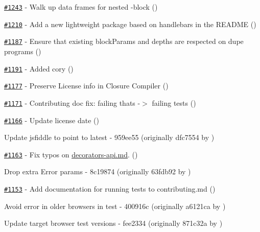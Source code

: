 \begin{DoxyItemize}
\item \href{https://github.com/wycats/handlebars.js/pull/1243}{\tt \#1243} -\/ Walk up data frames for nested -\/block (\href{https://github.com/lawnsea}{\tt })
\item \href{https://github.com/wycats/handlebars.js/pull/1210}{\tt \#1210} -\/ Add a new lightweight package based on handlebars in the R\+E\+A\+D\+ME (\href{https://github.com/kabirbaidhya}{\tt })
\item \href{https://github.com/wycats/handlebars.js/pull/1187}{\tt \#1187} -\/ Ensure that existing block\+Params and depths are respected on dupe programs (\href{https://github.com/charleso}{\tt })
\item \href{https://github.com/wycats/handlebars.js/pull/1191}{\tt \#1191} -\/ Added cory (\href{https://github.com/leo}{\tt })
\item \href{https://github.com/wycats/handlebars.js/pull/1177}{\tt \#1177} -\/ Preserve License info in Closure Compiler (\href{https://github.com/gennadiylitvinyuk}{\tt })
\item \href{https://github.com/wycats/handlebars.js/pull/1171}{\tt \#1171} -\/ Contributing doc fix\+: failing thats -\/$>$ failing tests (\href{https://github.com/paulfalgout}{\tt })
\item \href{https://github.com/wycats/handlebars.js/pull/1166}{\tt \#1166} -\/ Update license date (\href{https://github.com/timwangdev}{\tt })
\item Update jsfiddle to point to latest -\/ 959ee55 (originally dfc7554 by \href{https://github.com/kpdecker}{\tt })
\item \href{https://github.com/wycats/handlebars.js/pull/1163}{\tt \#1163} -\/ Fix typos on \mbox{\hyperlink{decorators-api_8md}{decorators-\/api.\+md}}. (\href{https://github.com/adjohnson916}{\tt })
\item Drop extra Error params -\/ 8c19874 (originally 63fdb92 by \href{https://github.com/kpdecker}{\tt })
\item \href{https://github.com/wycats/handlebars.js/pull/1153}{\tt \#1153} -\/ Add documentation for running tests to contributing.\+md (\href{https://github.com/ryanmurakami}{\tt })
\item Avoid error in older browsers in test -\/ 400916c (originally a6121ca by \href{https://github.com/kpdecker}{\tt })
\item Update target browser test versions -\/ fee2334 (originally 871c32a by \href{https://github.com/kpdecker}{\tt })

\end{DoxyItemize}
